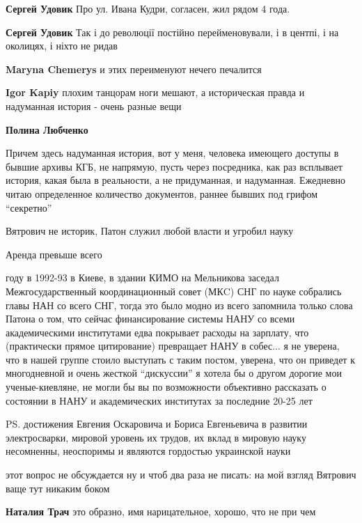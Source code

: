 \begin{itemize}
\begin{itemize}
\begin{itemize}
\textbf{Сергей Удовик} Про ул. Ивана Кудри, согласен, жил рядом 4 года.

\textbf{Сергей Удовик} Так і до революції постійно перейменовували, і в центпі, і на околицях, і ніхто не ридав

\textbf{Maryna Chemerys} и этих переименуют нечего печалится
\end{itemize} %

\textbf{Igor Kapiy} плохим танцорам ноги мешают, а историческая правда и
надуманная история - очень разные вещи

\textbf{Полина Любченко} 

Причем здесь надуманная история, вот у меня, человека имеющего доступы в бывшие
архивы КГБ, не напрямую, пусть через посредника, как раз всплывает история,
какая была в реальности, а не придуманная, и надуманная. Ежедневно читаю
определенное количество документов, раннее бывших под грифом \enquote{секретно}


Вятрович не историк, Патон служил любой власти и угробил науку

\end{itemize} %

Аренда превыше всего


году в 1992-93 в Киеве, в здании КИМО на Мельникова заседал Межгосударственный
координационный совет (МКC) СНГ по науке собрались главы НАН со всего СНГ,
тогда это было модно из всего запомнила только слова Патона о том, что сейчас
финансирование системы НАНУ со всеми академическими институтами едва покрывает
расходы на зарплату, что (практически прямое цитирование) превращает НАНУ в
собес...  я не уверена, что в нашей группе стоило выступать с таким постом,
уверена, что он приведет к многодневной и очень жесткой \enquote{дискуссии} я хотела бы
о другом дорогие мои ученые-киевляне, не могли бы вы по возможности объективно
рассказать о состоянии в НАНУ и академических институтах за последние 20-25 лет

PS. достижения Евгения Оскаровича и Бориса Евгеньевича в развитии
электросварки, мировой уровень их трудов, их вклад в мировую науку несомненны,
неоспоримы и являются гордостью украинской науки

этот вопрос не обсуждается ну и чтоб два раза не писать: на мой взгляд Вятрович
ваще тут никаким боком

\begin{itemize} %
\textbf{Наталия Трач} это образно, имя нарицательное, хорошо, что не при чем


\end{itemize}
\end{itemize}
